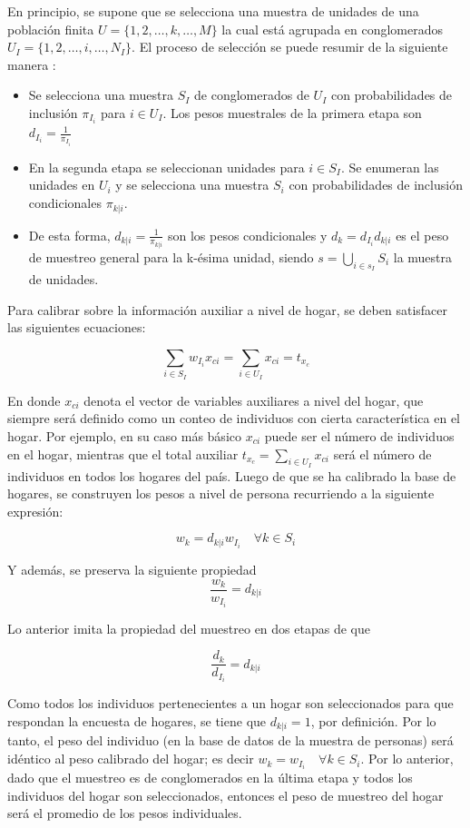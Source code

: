 \documentclass[
  10pt,
  spanish,
]{book}
\providecommand{\tightlist}{%
  \setlength{\itemsep}{0pt}\setlength{\parskip}{0pt}}
\begin{document}
En principio, se supone que se selecciona una muestra de unidades de una población finita \(U = \lbrace 1,2,\ldots,k,\ldots,M\rbrace\) la cual está agrupada en conglomerados \(U_I = \lbrace 1, 2,\ldots, i, \ldots, N_I \rbrace\). El proceso de selección se puede resumir de la siguiente manera \citep{Gutierrez_2016}:

\begin{itemize}
\tightlist
\item
  Se selecciona una muestra \(S_I\) de conglomerados de \(U_I\) con probabilidades de inclusión \(\pi_{I_i}\) para \(i\in U_I\). Los pesos muestrales de la primera etapa son \(d_{I_i} = \frac{1}{\pi_{I_i}}\)
\item
  En la segunda etapa se seleccionan unidades para \(i\in S_I\). Se enumeran las unidades en \(U_i\) y se selecciona una muestra \(S_i\) con probabilidades de inclusión condicionales \(\pi_{k|i}\).
\item
  De esta forma, \(d_{k|i} = \frac{1}{\pi_{k|i}}\) son los pesos condicionales y \(d_k = d_{I_i}d_{k|i}\) es el peso de muestreo general para la k-ésima unidad, siendo \(s =\bigcup_{i\in s_I}S_i\) la muestra de unidades.
\end{itemize}

Para calibrar sobre la información auxiliar a nivel de hogar, se deben satisfacer las siguientes ecuaciones:

\[
\sum_{i \in S_I}w_{I_i}x_{ci} = \sum_{i \in U_I}x_{ci} = t_{x_c}
\]

En donde \(x_{ci}\) denota el vector de variables auxiliares a nivel del hogar, que siempre será definido como un conteo de individuos con cierta característica en el hogar. Por ejemplo, en su caso más básico \(x_{ci}\) puede ser el número de individuos en el hogar, mientras que el total auxiliar \(t_{x_c} = \sum_{i \in U_I}x_{ci}\) será el número de individuos en todos los hogares del país. Luego de que se ha calibrado la base de hogares, se construyen los pesos a nivel de persona recurriendo a la siguiente expresión:

\[
w_k = d_{k|i}w_{I_i} \quad \forall k \in S_i
\]

Y además, se preserva la siguiente propiedad
\[
\frac{w_k}{w_{I_i}}=d_{k|i}
\]

Lo anterior imita la propiedad del muestreo en dos etapas de que

\[
\frac{d_k}{d_{I_i}}=d_{k|i}
\]

Como todos los individuos pertenecientes a un hogar son seleccionados para que respondan la encuesta de hogares, se tiene que \(d_{k|i} = 1\), por definición. Por lo tanto, el peso del individuo (en la base de datos de la muestra de personas) será idéntico al peso calibrado del hogar; es decir \(w_k = w_{I_i} \quad \forall k \in S_i\). Por lo anterior, dado que el muestreo es de conglomerados en la última etapa y todos los individuos del hogar son seleccionados, entonces el peso de muestreo del hogar será el promedio de los pesos individuales.
\end{document}
